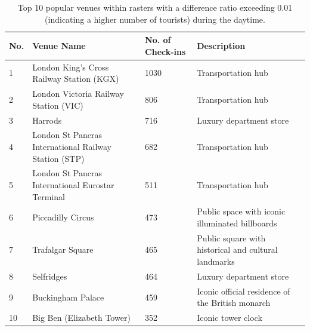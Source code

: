 \documentclass{article}
\theoremstyle{remark}
\begin{document}
\begin{table}[!h]
\centering
\caption{\label{tab:popular_venues_touristspop_daytime}Top 10 popular venues within rasters with a difference ratio exceeding 0.01 (indicating a higher number of tourists) during the daytime.}
\begin{adjustbox}{max width=\textwidth, margin=0cm}
\begin{threeparttable}
\begin{tabular}{lp{5cm}lp{4cm}} \hline
No. & Venue Name & No. of Check-ins & Description \\ \hline
1 & London King's Cross Railway Station (KGX) & 1030 & Transportation hub \\
2 & London Victoria Railway Station (VIC) & 806 & Transportation hub \\
3 & Harrods & 716 & Luxury department store \\
4 & London St Pancras International Railway Station (STP) & 682 & Transportation hub \\
5 & London St Pancras International Eurostar Terminal & 511 & Transportation hub \\
6 & Piccadilly Circus & 473 & Public space with iconic illuminated billboards \\
7 & Trafalgar Square & 465 & Public square with historical and cultural landmarks \\
8 & Selfridges & 464 & Luxury department store \\
9 & Buckingham Palace & 459 & Iconic official residence of the British monarch \\
10 & Big Ben (Elizabeth Tower) & 352 & Iconic tower clock \\ \hline
\end{tabular}
\end{threeparttable}
\end{adjustbox}
\end{table}
\end{document}
